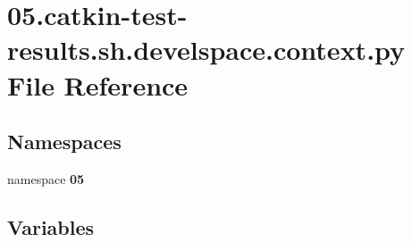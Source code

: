 \section{05.catkin-\/test-\/results.sh.\-develspace.\-context.\-py \-File \-Reference}
\label{05_8catkin-test-results_8sh_8develspace_8context_8py}
\subsection*{\-Namespaces}
\begin{DoxyCompactItemize}
\item 
namespace {\bf 05}
\end{DoxyCompactItemize}
\subsection*{\-Variables}
